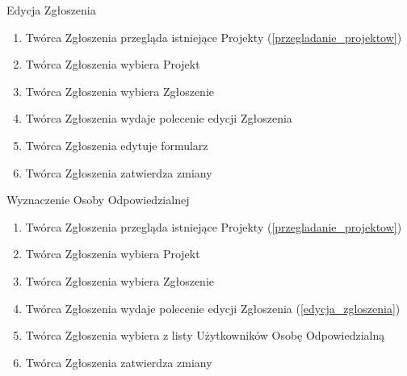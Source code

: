 \begin{usecase}{Edycja Zgłoszenia}
\label{edycja_zgloszenia}
	\begin{enumerate}
	\item Twórca Zgłoszenia przegląda istniejące Projekty (\ref{przegladanie_projektow})
    \item Twórca Zgłoszenia wybiera Projekt
    \item Twórca Zgłoszenia wybiera Zgłoszenie
    \item Twórca Zgłoszenia wydaje polecenie edycji Zgłoszenia
    \item Twórca Zgłoszenia edytuje formularz
    \item Twórca Zgłoszenia zatwierdza zmiany
	\end{enumerate}
\end{usecase}


\begin{usecase}{Wyznaczenie Osoby Odpowiedzialnej}
\label{wyznaczenie_osoby_odpowiedzialnej}
	\begin{enumerate}
    \item Twórca Zgłoszenia przegląda istniejące Projekty (\ref{przegladanie_projektow})
  	\item Twórca Zgłoszenia wybiera Projekt
  	\item Twórca Zgłoszenia wybiera Zgłoszenie
  	\item Twórca Zgłoszenia wydaje polecenie edycji Zgłoszenia (\ref{edycja_zgloszenia})
  	\item Twórca Zgłoszenia wybiera z listy Użytkowników Osobę Odpowiedzialną
  	\item Twórca Zgłoszenia zatwierdza zmiany
	\end{enumerate}
\end{usecase}


